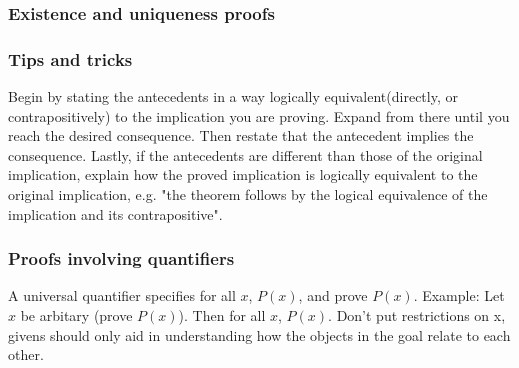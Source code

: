 \documentclass{article}
\begin{document}
\subsubsection{Existence and uniqueness proofs}
\subsubsection{Tips and tricks}
Begin by stating the antecedents in a way logically equivalent(directly, or contrapositively) to the implication you are proving. Expand from there until you reach the desired consequence. Then restate that the antecedent implies the consequence. Lastly, if the antecedents are different than those of the original implication, explain how the proved implication is logically equivalent to the original implication, e.g. "the theorem follows by the logical equivalence of the implication and its contrapositive".
\subsubsection{Proofs involving quantifiers}
A universal quantifier specifies for all \(x\), \(P(x)\), and prove \(P(x)\). Example: Let \(x\) be arbitary (prove \(P(x)\)). Then for all \(x\), \(P(x)\). Don't put restrictions on x, givens should only aid in understanding how the objects in the goal relate to each other.
\subsection{}
\end{document}
